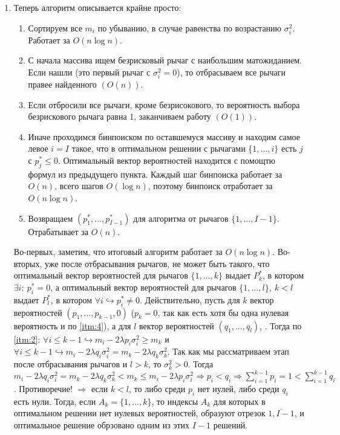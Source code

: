 \documentclass{article}
\begin{document}
\begin{enumerate}
    \item Теперь алгоритм описывается крайне просто:
    \begin{enumerate}
        \item Сортируем все $m_i$ по убыванию, в случае равенства по возрастанию $\sigma_i^2$. Работает за $O(n \log n)$.
        \item С начала массива ищем безрисковый рычаг с наибольшим матожиданием. Если нашли (это первый рычаг с $\sigma_i^2 = 0$), то отбрасываем все рычаги правее найденного $\left(O(n) \right)$. 
        \item Если отбросили все рычаги, кроме безрисокового, то вероятность выбора безрискового рычага равна 1, заканчиваем работу $\left( O(1) \right)$.
        \item Иначе проходимся бинпоиском по оставшемуся массиву и находим самое левое $i=I$ такое, что в оптимальном решении с рычагами $\{1, ..., i\}$ есть $j$ с $p_j^* \leq 0$. Оптимальный вектор вероятностей находится с помощтю формул из предыдущего пункта. Каждый шаг бинпоиска работает за $O(n)$, всего шагов $O(\log n)$, поэтому бинпоиск отработает за $O(n \log n)$.
        \item Возвращаем $(p_1^*, ..., p_{I-1}^*)$ для алгоритма от рычагов $\{1, ..., I-1\}$. Отрабатывает за $O(n)$.
    \end{enumerate}
    Во-первых, заметим, что итоговый алгоритм работает за $O(n \log n)$. Во-вторых, уже после отбрасывания рычагов, не может быть такого, что оптимальный вектор вероятностей для рычагов $\{1,...,k\}$ выдает $P_k^*$, в котором $\exists i: \: p_i^* = 0$, а оптимальный вектор вероятностей для рычагов $\{1, ..., l\}, \: k < l$ выдает $P_l^*$, в котором $\forall i \hookrightarrow p_i^* \neq 0$. Действительно, пусть для $k$ вектор вероятностей $(p_1, ..., p_{k-1}, 0)$ ($p_k = 0$, так как есть хотя бы одна нулевая вероятность и по \ref{itm:4}), а для $l$ вектор вероятностей $(q_1, ..., q_l)$, . Тогда по \ref{itm:2}: $\forall i \leq k - 1 \hookrightarrow m_i - 2 \lambda p_i \sigma_i^2 \geq m_k$ и $\forall i \leq k - 1 \hookrightarrow m_i - 2 \lambda q_i \sigma_i^2 = m_k - 2 \lambda q_k \sigma_k^2$. Так как мы рассматриваем этап после отбрасывания рычагов и $l > k$, то $\sigma_k^2 > 0$. Тогда $m_i - 2 \lambda q_i \sigma_i^2 = m_k - 2 \lambda q_k \sigma_k^2 < m_k \leq m_i - 2 \lambda p_i \sigma_i^2 \Rightarrow p_i < q_i \Rightarrow \sum_{i=1}^{k-1} p_i = 1 < \sum_{i=1}^{k-1} q_i$. Противоречие! $\Rightarrow$ если $k < l$, то либо среди $p_i$ нет нулей, либо среди $q_i$ есть нули. Тогда, если $A_k = \{1, ..., k\}$, то индексы $A_k$ для которых в оптимальном решении нет нулевых вероятностей, образуют отрезок $\overline{1, I - 1}$, и оптимальное решение обрзовано одним из этих $I - 1$ решений.


\end{enumerate}
\end{document}
